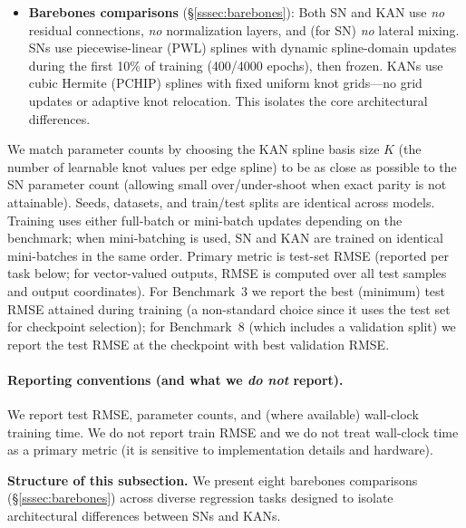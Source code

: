 \documentclass{article}
\theoremstyle{plain}
\theoremstyle{definition}
\theoremstyle{remark}
\begin{document}
\begin{itemize}[leftmargin=*,itemsep=2pt]
\item \textbf{Barebones comparisons} (\S\ref{sssec:barebones}): Both SN and KAN use \emph{no} residual connections, \emph{no} normalization layers, and (for SN) \emph{no} lateral mixing. SNs use piecewise-linear (PWL) splines with dynamic spline-domain updates during the first 10\% of training (400/4000 epochs), then frozen. KANs use cubic Hermite (PCHIP) splines with fixed uniform knot grids---no grid updates or adaptive knot relocation. This isolates the core architectural differences.
\end{itemize}

\noindent We match parameter counts by choosing the KAN spline basis size $K$ (the number of learnable knot values per edge spline) to be as close as possible to the SN parameter count (allowing small over/under-shoot when exact parity is not attainable). Seeds, datasets, and train/test splits are identical across models. Training uses either full-batch or mini-batch updates depending on the benchmark; when mini-batching is used, SN and KAN are trained on identical mini-batches in the same order. Primary metric is test-set RMSE (reported per task below; for vector-valued outputs, RMSE is computed over all test samples and output coordinates). For Benchmark~3 we report the best (minimum) test RMSE attained during training (a non-standard choice since it uses the test set for checkpoint selection); for Benchmark~8 (which includes a validation split) we report the test RMSE at the checkpoint with best validation RMSE.

\paragraph{Reporting conventions (and what we \emph{do not} report).}
We report test RMSE, parameter counts, and (where available) wall-clock training time. We do not report train RMSE and we do not treat wall-clock time as a primary metric (it is sensitive to implementation details and hardware).

\vspace{0.5ex}
\noindent\textbf{Structure of this subsection.} We present eight barebones comparisons (\S\ref{sssec:barebones}) across diverse regression tasks designed to isolate architectural differences between SNs and KANs.

\end{document}
